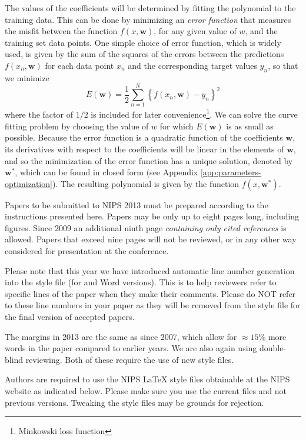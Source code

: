 \documentclass{article} %
\begin{document}
The values of the coefficients will be determined by fitting the polynomial to the training data. This can be done by minimizing an \textit{error function} that measures the misfit between the function $f(x, \mathbf{w})$, for any given value of $w$, and the training set data points. One simple choice of error function, which is widely used, is given by the sum of the squares of the errors between the predictions $f(x_n, \mathbf{w})$ for each data point $x_n$ and the corresponding target values $y_n$, so that we minimize
%
\begin{equation}
      E(\mathbf{w})=\frac{1}{2} \sum_{n=1}^{N}\left\{f\left(x_{n}, \mathbf{w}\right)-y_{n}\right\}^{2}
\end{equation}
%
where the factor of $1/2$ is included for later convenience\footnote{Minkowski loss function}. We can solve the curve fitting problem by choosing the value of $w$ for which $E(\mathbf{w})$ is as small as possible. Because the error function is a quadratic function of the coefficients $\mathbf{w}$, its derivatives with respect to the coefficients will be linear in the elements of $\mathbf{w}$, and so the minimization of the error function has a unique solution, denoted by $\mathbf{w}^*$, which can be found in closed form (see Appendix \ref{app:parameters-optimization}). The resulting polynomial is given by the function $f(x,\mathbf{w}^*)$.


Papers to be submitted to NIPS 2013 must be prepared according to the
instructions presented here. Papers may be only up to eight pages long,
including figures. Since 2009 an additional ninth page \textit{containing only
   cited references} is allowed. Papers that exceed nine pages will not be
reviewed, or in any other way considered for presentation at the conference.

Please note that this year we have introduced automatic line number generation
into the style file (for \LaTeXe and Word versions). This is to help reviewers
refer to specific lines of the paper when they make their comments. Please do
NOT refer to these line numbers in your paper as they will be removed from the
style file for the final version of accepted papers.

The margins in 2013 are the same as since 2007, which allow for $\approx 15\%$
more words in the paper compared to earlier years. We are also again using
double-blind reviewing. Both of these require the use of new style files.

Authors are required to use the NIPS \LaTeX{} style files obtainable at the
NIPS website as indicated below. Please make sure you use the current files and
not previous versions. Tweaking the style files may be grounds for rejection.
\end{document}
